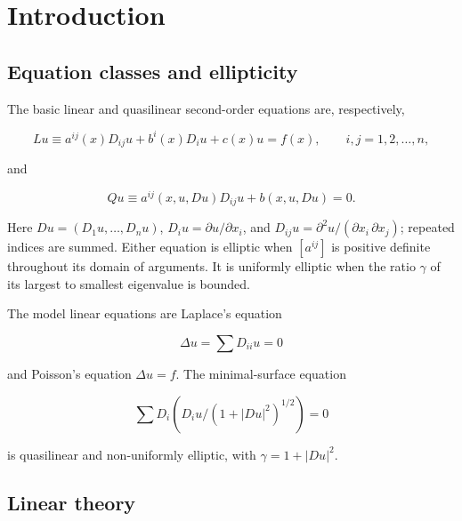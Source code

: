 \chapter{Introduction}

\section*{Equation classes and ellipticity}

The basic linear and quasilinear second-order equations are, respectively,

\begin{equation}\label{gt.eq1.1}
\tag{1.1}
Lu \equiv a^{ij}(x)D_{ij}u+b^i(x)D_i u+c(x)u=f(x),\qquad i,j=1,2,\dots,n,
\end{equation}

and

\begin{equation}\label{gt.eq1.2}
\tag{1.2}
Qu \equiv a^{ij}(x,u,Du)D_{ij}u+b(x,u,Du)=0.
\end{equation}

Here $Du=(D_1u,\dots,D_nu)$, $D_i u=\partial u/\partial x_i$, and
$D_{ij}u=\partial^2u/(\partial x_i\,\partial x_j)$; repeated indices are
summed. Either equation is elliptic when $[a^{ij}]$ is positive definite
throughout its domain of arguments. It is uniformly elliptic when the ratio
$\gamma$ of its largest to smallest eigenvalue is bounded.

The model linear equations are Laplace's equation

\begin{equation}\label{gt.eq1.3}
\Delta u = \sum D_{ii}u = 0
\end{equation}

and Poisson's equation $\Delta u=f$. The minimal-surface equation

\begin{equation}\label{gt.eq1.4}
\sum D_i\!\left(D_i u/(1+|Du|^2)^{1/2}\right)=0
\end{equation}

is quasilinear and non-uniformly elliptic, with
$\gamma=1+|Du|^2$.

\section*{Linear theory}

